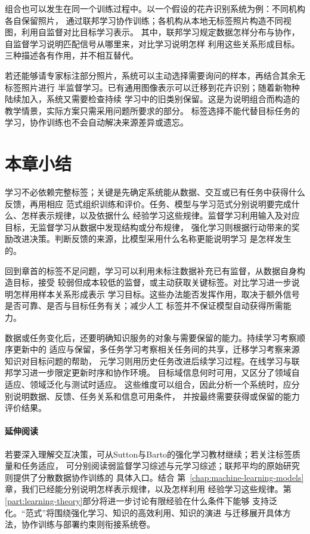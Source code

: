 组合也可以发生在同一个训练过程中。以一个假设的花卉识别系统为例：不同机构各自保留照片，
通过联邦学习协作训练；各机构从本地无标签照片构造不同视图，利用自监督对比目标学习表示。
其中，联邦学习规定数据怎样分布与协作，自监督学习说明匹配信号从哪里来，对比学习说明怎样
利用这些关系形成目标。三种描述各有作用，并不相互替代。

若还能够请专家标注部分照片，系统可以主动选择需要询问的样本，再结合其余无标签照片进行
半监督学习。已有通用图像表示可以迁移到花卉识别；随着新物种陆续加入，系统又需要检查持续
学习中的旧类别保留。这是为说明组合而构造的教学情景，实际方案只需采用问题所要求的部分。
标签选择不能代替目标任务的学习，协作训练也不会自动解决来源差异或遗忘。

\section{本章小结}
\label{sec:machine-learning-paradigms-summary}

学习不必依赖完整标签；关键是先确定系统能从数据、交互或已有任务中获得什么反馈，再用相应
范式组织训练和评价。任务、模型与学习范式分别说明要完成什么、怎样表示规律，以及依据什么
经验学习这些规律。监督学习利用输入及对应目标，无监督学习从数据中发现结构或分布规律，
强化学习则根据行动带来的奖励改进决策。判断反馈的来源，比模型采用什么名称更能说明学习
是怎样发生的。

回到章首的标签不足问题，学习可以利用未标注数据补充已有监督，从数据自身构造目标，接受
较弱但成本较低的监督，或主动获取关键标签。对比学习进一步说明怎样用样本关系形成表示
学习目标。这些办法能否发挥作用，取决于额外信号是否可靠、是否与目标任务有关；减少人工
标签并不保证模型自动获得所需能力。

数据或任务变化后，还要明确知识服务的对象与需要保留的能力。持续学习考察顺序更新中的
适应与保留，多任务学习考察相关任务间的共享，迁移学习考察来源知识对目标问题的帮助，
元学习则用历史任务改进后续学习过程。在线学习与联邦学习进一步限定更新时序和协作环境。
目标域信息何时可用，又区分了领域自适应、领域泛化与测试时适应。
这些维度可以组合，因此分析一个系统时，应分别说明数据、反馈、任务关系和信息可用条件，
并按最终需要获得或保留的能力评价结果。

\paragraph{延伸阅读}

若要深入理解交互决策，可从Sutton与Barto的强化学习教材继续；若关注标签质量和任务适应，
可分别阅读弱监督学习综述与元学习综述；联邦平均的原始研究则提供了分散数据协作训练的
具体入口。结合
第~\ref{chap:machine-learning-models}章，我们已经能分别说明怎样表示规律，以及怎样利用
经验学习这些规律。第\ref{part:learning-theory}部分将进一步讨论有限经验在什么条件下能够
支持泛化。“范式”将围绕强化学习、知识的高效利用、知识的演进
与迁移展开具体方法，协作训练与部署约束则衔接系统卷。
